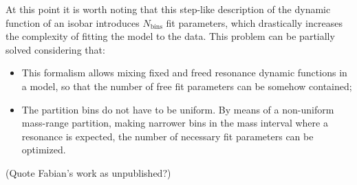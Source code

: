     At this point it is worth noting that this step-like description of the dynamic function of an isobar introduces $N_\text{bins}$ fit parameters, which drastically increases the complexity of fitting the model to the data.
    This problem can be partially solved considering that:
    \begin{itemize}
        \item 
            This formalism allows mixing fixed and freed resonance dynamic functions in a model, so that the number of free fit parameters can be somehow contained;
        \item
            The partition bins do not have to be uniform. By means of a non-uniform mass-range partition, making narrower bins in the mass interval where a resonance is expected, the number of necessary fit parameters can be optimized.
    \end{itemize}

    {\color{red}
    (Quote Fabian's work as unpublished?)
    }

